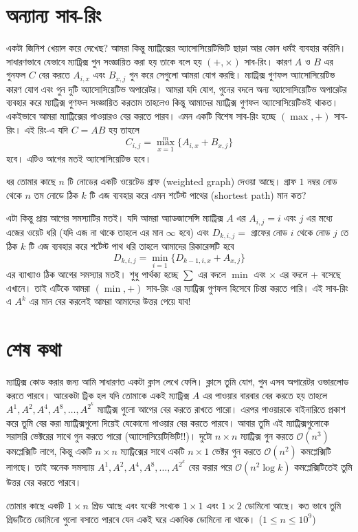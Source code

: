 \section{অন্যান্য সাব-রিং}
একটা জিনিশ খেয়াল করে দেখেছ? আমরা কিন্তু ম্যাট্রিক্সের অ্যাসোসিয়েটিভিটি ছাড়া আর কোন ধর্মই ব্যবহার করিনি। সাধারণভাবে যেভাবে ম্যাট্রিক্স গুন সংজ্ঞায়িত করা হয় তাকে বলে হয় $(+, \times)$ সাব-রিং। কারণ  $A$ ও $B$ এর গুনফল $C$ বের করতে $A_{i, x}$ এবং $B_{x, j}$ গুন করে সেগুলো আমরা যোগ করছি। ম্যাট্রিক্স গুণফল  অ্যাসোসিয়েটিভ কারণ যোগ এবং গুন দুটি অ্যাসোসিয়েটিভ অপারেটর। আমরা যদি যোগ, গুনের বদলে অন্য অ্যাসোসিয়েটিভ অপারেটর ব্যবহার করে ম্যাট্রিক্স গুণফল সংজ্ঞায়িত করতাম তাহলেও কিন্তু আমাদের ম্যাট্রিক্স গুণফল অ্যাসোসিয়েটিভই থাকত। একইভাবে আমরা ম্যাট্রিক্সের পাওয়ারও বের করতে পারব। এমন একটি বিশেষ সাব-রিং হচ্ছে $(\max, +)$ সাব-রিং। এই রিং-এ যদি $C = AB$ হয় তাহলে 
$$C_{i, j} = \max_{x = 1}^m \lbrace A_{i, x} + B_{x, j} \rbrace$$
হবে। এটিও আগের মতই অ্যাসোসিয়েটিভ হবে। 
\begin{problem}
ধর তোমার কাছে $n$ টি নোডের একটি ওয়েটেড গ্রাফ (weighted graph) দেওয়া আছে। গ্রাফ $1$ নম্বর নোড থেকে $n$ তম নোডে ঠিক $k$ টি এজ ব্যবহার করে এমন শর্টেস্ট পাথের (shortest path) মান কত?  
\end{problem}
\begin{solution}
এটা কিন্তু প্রায় আগের সমস্যাটির মতই। যদি আমরা অ্যাডজাসেন্সি ম্যাট্রিক্স $A$ এর $A_{i, j} = i$ এবং $j$ এর মধ্যে এজের ওয়েট ধরি (যদি এজ না থাকে তাহলে এর মান $\infty$ হবে) এবং  $D_{k, i, j} = $ গ্রাফের নোড $i$ থেকে নোড $j$ তে ঠিক $k$ টি এজ ব্যবহার করে শর্টেস্ট পাথ ধরি তাহলে আমাদের রিকারেন্সটি হবে 
$$ D_{k, i, j} = \min_{i = 1} \lbrace D_{k - 1, i, x} + A_{x, j} \rbrace$$
এর ব্যাখ্যাও ঠিক আগের সমস্যার মতই। শুধু পার্থক্য হচ্ছে $\sum$ এর বদলে $\min$ এবং $\times$ এর বদলে $+$ বসেছে এখানে। তাই এটিকে আমরা $(\min, +)$ সাব-রিং এর ম্যাট্রিক্স গুণফল হিসেবে চিন্তা করতে পারি। এই সাব-রিং এ $A^{k}$ এর মান বের করলেই আমরা আমাদের উত্তর পেয়ে যাব!
\end{solution}

\section{শেষ কথা}
ম্যাট্রিক্স কোড করার জন্য আমি সাধারণত একটা ক্লাস লেখে ফেলি। ক্লাসে তুমি যোগ, গুন এসব অপারেটর ওভারলোড করতে পারবে। আরেকটা ট্রিক হল যদি তোমাকে একই ম্যাট্রিক্স $A$ এর পাওয়ার বারবার বের করতে হয় তাহলে $A^1, A^2, A^4, A^8, \dots, A^{2^k}$ ম্যাট্রিক্স গুলো আগের বের করতে রাখতে পারো। এরপর পাওয়ারকে বাইনারিতে প্রকাশ করে তুমি বের করা ম্যাট্রিক্সগুলো দিয়েই যেকোনো পাওয়ার বের করতে পারবে। আবার তুমি এই ম্যাট্রিক্সগুলোকে সরাসরি ভেক্টরের সাথে গুন করতে পারো (অ্যাসোসিয়েটিভিটি!!)।  দুটো $n \times n$ ম্যাট্রিক্স গুন করতে $\mathcal{O}(n^3)$ কমপ্লেক্সিটি লাগে, কিন্তু একটি $n \times n$ ম্যাট্রিক্সের সাথে একটি $n \times 1$ ভেক্টর গুন করতে $\mathcal{O}(n^2)$ কমপ্লেক্সিটি লাগছে। তাই অনেক সমস্যায় $A^1, A^2, A^4, A^8, \dots, A^{2^k}$ বের করার পরে $\mathcal{O}(n^2 \log{k})$ কমপ্লেক্সিটিতেই তুমি উত্তর বের করতে পারবে। 

\begin{diybox}
তোমার কাছে একটি $1 \times n$ গ্রিড আছে এবং যথেষ্ট সংখ্যক $1 \times 1$ এবং $1 \times 2$ ডোমিনো আছে। কত ভাবে তুমি গ্রিডটিতে ডোমিনো গুলো বসাতে পারবে যেন একই ঘরে একাধিক ডোমিনো না থাকে। ($1 \leq n \leq 10^{9}$)
\end{diybox}


